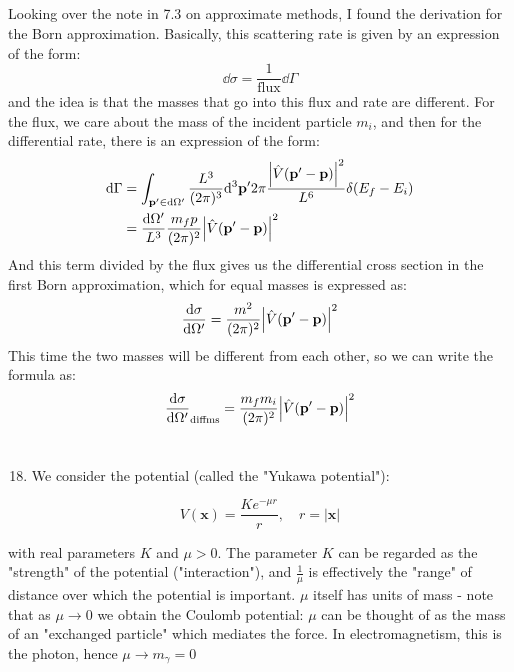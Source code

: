 \documentclass[12pt]{article}
\begin{document}
\subsection{}
Looking over the note in 7.3 on approximate methods, I found the derivation for the Born approximation. Basically, this scattering rate is given by an expression of the form:
\begin{equation}
  \dd{\sigma }= \frac{1}{\text{flux}}\dd{\Gamma }
\end{equation}
and the idea is that the masses that go into this flux and rate are different. For the flux, we care about the mass of the incident particle $m_{i}$,
and then for the differential rate, there is an expression of the form:
\begin{align}
  \dd{\Gamma }&= \int_{\mathbf{p'}\in \dd{\Omega '}}\frac{L^3}{(2\pi)^3}\dd^3{\mathbf{p'}} 2 \pi \frac{\abs{\hat{V}(\mathbf{p'}-\mathbf{p})}^2}{L^6}\delta (E_{f}-E_{i})\\
&= \frac{\dd{\Omega '}}{L^3}\frac{m_{f}p}{(2\pi)^2}\abs{\hat{V}(\mathbf{p'}-\mathbf{p})}^2
\end{align}
And this term divided by the flux gives us the differential cross section in the first Born approximation, which for equal masses is expressed as:
\begin{equation}
  \frac{\dd{\sigma }}{\dd{\Omega '}}= \frac{m^2}{(2\pi)^2}\abs{\hat{V}(\mathbf{p'}-\mathbf{p})}^2
\end{equation}
This time the two masses will be different from each other, so we can write the formula as:
\begin{equation}
  \frac{\dd{\sigma }}{\dd{\Omega '}}_{\text{diffms}}= \frac{m_{f}m_{i}}{(2\pi)^2}\abs{\hat{V}(\mathbf{p'}-\mathbf{p})}^2
\end{equation}
\section{}
\begin{enumerate}
  \setcounter{enumi}{17}
  \item We consider the potential (called the "Yukawa potential"):
\end{enumerate}

$$
V(\mathbf{x})=\frac{K e^{-\mu r}}{r}, \quad r=|\mathbf{x}|
$$

with real parameters $K$ and $\mu>0$. The parameter $K$ can be regarded as the "strength" of the potential ("interaction"), and $\frac{1}{\mu}$ is effectively the "range" of distance over which the potential is important. $\mu$ itself has units of mass - note that as $\mu \rightarrow 0$ we obtain the Coulomb potential: $\mu$ can be thought of as the mass of an "exchanged particle" which mediates the force. In electromagnetism, this is the photon, hence $\mu \rightarrow m_{\gamma}=0$
\end{document}
